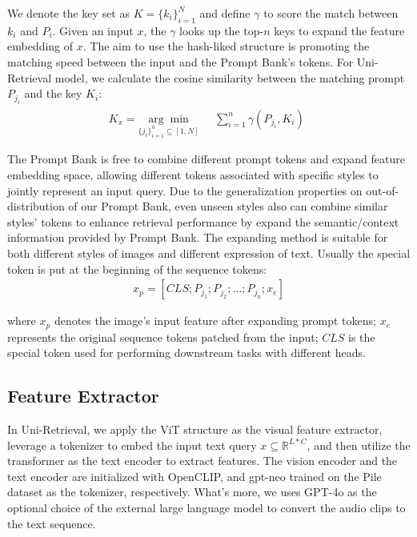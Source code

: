 We denote the key set as $K = \{k_i\}^{N}_{i=1}$ and define $\gamma$ to score the match between $k_i$ and $P_i$. Given an input $x$, the $\gamma$ looks up the top-$n$ keys to expand the feature embedding of $x$. The aim to use the hash-liked structure is promoting the matching speed between the input and the Prompt Bank's tokens. For Uni-Retrieval model, we calculate the cosine similarity between the matching prompt $P_{j_i}$ and the key $K_i$:
{\setlength{\abovedisplayskip}{7pt}
\setlength{\belowdisplayskip}{7pt}
\begin{eqnarray}
K_x={\underset{\{j_i\}^{n}_{i=1}\subseteq [1,N]}{\arg\min}}\quad \begin{matrix}\sum^{n}_{i=1}\gamma(P_{j_i}, K_i)\end{matrix}
\end{eqnarray}}

The Prompt Bank is free to combine different prompt tokens and expand feature embedding space, allowing different tokens associated with specific styles to jointly represent an input query. Due to the generalization properties on out-of-distribution of our Prompt Bank, even unseen styles also can combine similar styles' tokens to enhance retrieval performance by expand the semantic/context information provided by Prompt Bank. The expanding method is suitable for both different styles of images and different expression of text. 
Usually the special token is put at the beginning of the sequence tokens:
{\setlength{\abovedisplayskip}{6pt}
\setlength{\belowdisplayskip}{6pt}
\begin{eqnarray}
x_p = [CLS;P_{j_1};P_{j_2};\dots;P_{j_n};x_e]
\end{eqnarray}}

\noindent where $x_p$ denotes the image's input feature after expanding prompt tokens; $x_e$ represents  the original sequence tokens patched from the input; $CLS$ is the special token used for performing downstream tasks with different heads.


\subsection{Feature Extractor}
\label{subsec:foundation_model}
In Uni-Retrieval, we apply the ViT structure as the visual feature extractor, leverage a tokenizer to embed the input text query $x \subseteq \mathbb{R}^{L*C}$, and then utilize the transformer \cite{vaswani2017attention} as the text encoder to extract features. 
The vision encoder and the text encoder are initialized with OpenCLIP, and gpt-neo \cite{gpt-neo} trained on the Pile dataset as the tokenizer, respectively.
What's more, we uses GPT-4o \cite{hurst2024gpt} as the optional choice of the external large language model to convert the audio clips to the text sequence.

